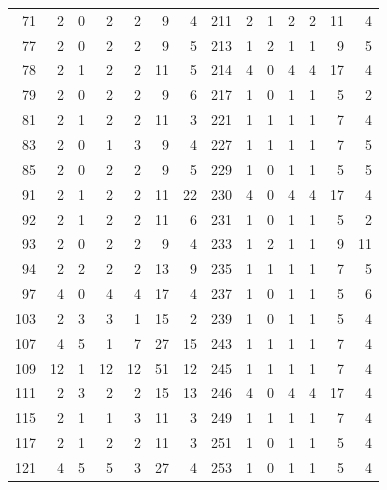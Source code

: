 \begin{tabular}{rrrrrrr|rrrrrrr}
71 & 2 & 0 & 2 & 2 & 9 & 4 & 211 & 2 & 1 & 2 & 2 & 11 & 4 \\
77 & 2 & 0 & 2 & 2 & 9 & 5 & 213 & 1 & 2 & 1 & 1 & 9 & 5 \\
78 & 2 & 1 & 2 & 2 & 11 & 5 & 214 & 4 & 0 & 4 & 4 & 17 & 4 \\
79 & 2 & 0 & 2 & 2 & 9 & 6 & 217 & 1 & 0 & 1 & 1 & 5 & 2 \\
81 & 2 & 1 & 2 & 2 & 11 & 3 & 221 & 1 & 1 & 1 & 1 & 7 & 4 \\
83 & 2 & 0 & 1 & 3 & 9 & 4 & 227 & 1 & 1 & 1 & 1 & 7 & 5 \\
85 & 2 & 0 & 2 & 2 & 9 & 5 & 229 & 1 & 0 & 1 & 1 & 5 & 5 \\
91 & 2 & 1 & 2 & 2 & 11 & 22 & 230 & 4 & 0 & 4 & 4 & 17 & 4 \\
92 & 2 & 1 & 2 & 2 & 11 & 6 & 231 & 1 & 0 & 1 & 1 & 5 & 2 \\
93 & 2 & 0 & 2 & 2 & 9 & 4 & 233 & 1 & 2 & 1 & 1 & 9 & 11 \\
94 & 2 & 2 & 2 & 2 & 13 & 9 & 235 & 1 & 1 & 1 & 1 & 7 & 5 \\
97 & 4 & 0 & 4 & 4 & 17 & 4 & 237 & 1 & 0 & 1 & 1 & 5 & 6 \\
103 & 2 & 3 & 3 & 1 & 15 & 2 & 239 & 1 & 0 & 1 & 1 & 5 & 4 \\
107 & 4 & 5 & 1 & 7 & 27 & 15 & 243 & 1 & 1 & 1 & 1 & 7 & 4 \\
109 & 12 & 1 & 12 & 12 & 51 & 12 & 245 & 1 & 1 & 1 & 1 & 7 & 4 \\
111 & 2 & 3 & 2 & 2 & 15 & 13 & 246 & 4 & 0 & 4 & 4 & 17 & 4 \\
115 & 2 & 1 & 1 & 3 & 11 & 3 & 249 & 1 & 1 & 1 & 1 & 7 & 4 \\
117 & 2 & 1 & 2 & 2 & 11 & 3 & 251 & 1 & 0 & 1 & 1 & 5 & 4 \\
121 & 4 & 5 & 5 & 3 & 27 & 4 & 253 & 1 & 0 & 1 & 1 & 5 & 4 \\
\bottomrule\end{tabular}